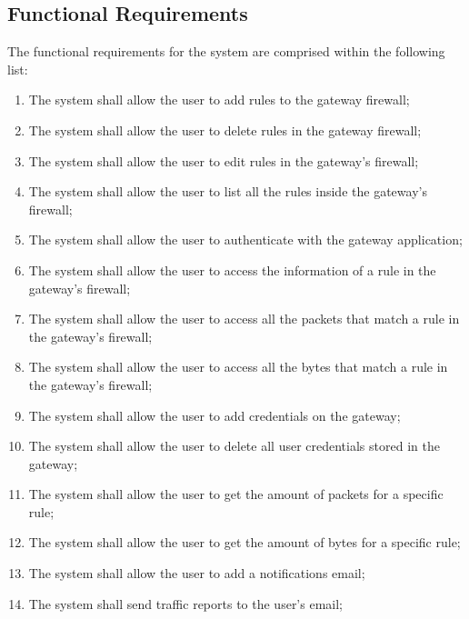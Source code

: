 \subsection{Functional Requirements}
\label{chap3:sec:reqs:func}
The functional requirements for the system are comprised within the following
list:
\begin{enumerate}
	\item The system shall allow the user to add rules to the gateway firewall;
	\item The system shall allow the user to delete rules in the gateway
		firewall;
	\item The system shall allow the user to edit rules in the gateway's
		firewall;
	\item The system shall allow the user to list all the rules inside the
		gateway's firewall;
	\item The system shall allow the user to authenticate with the gateway
		application;
	\item The system shall allow the user to access the information of a rule in
		the gateway's firewall;
	\item The system shall allow the user to access all the packets that match a
		rule in the gateway's firewall;
	\item The system shall allow the user to access all the bytes that match a
		rule in the gateway's firewall;
	\item The system shall allow the user to add credentials on the gateway;
	\item The system shall allow the user to delete all user credentials stored
		in the gateway;
	\item The system shall allow the user to get the amount of packets for a
		specific rule;
	\item The system shall allow the user to get the amount of bytes for a
		specific rule;
	\item The system shall allow the user to add a notifications email;
	\item The system shall send traffic reports to the user's email;
\end{enumerate}

